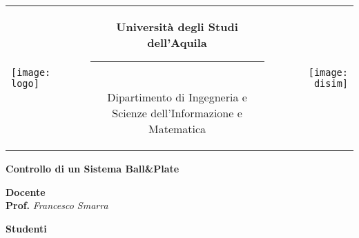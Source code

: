 \begin{titlepage}
\begin{center}
\normalsize

\begin{center}

\begin{tabular}[t]{@{} l @{} c @{} r @{}}
\parbox[c]{0.15\textwidth}{\raggedright \texttt{[image: logo]}}
&
\parbox[c]{0.7\textwidth}
{
\centering \bfseries
Università degli Studi dell'Aquila \\[-5pt]
\rule{0.6\textwidth}{1pt} \\
{\centering \small Dipartimento di Ingegneria e \\Scienze dell'Informazione e Matematica} \\
}
&
\parbox[c]{0.15\textwidth}{\raggedleft \texttt{[image: disim]}}
\end{tabular}
\end{center}

\bigskip \bigskip



\bigskip
\bigskip
\bigskip

\vfil

{\bfseries \huge
Controllo di un Sistema Ball\&Plate \\
}

{\large
\bigskip
\bigskip
\bigskip
\bigskip
{\bfseries \large Docente \\ }
\bigskip
\textbf{Prof.} \textit{Francesco Smarra} \\
}

{\bfseries \large
\bigskip
\bigskip
\bigskip
\bigskip
Studenti \\
}

\vfil
\vfil

\end{center}
\end{titlepage}

